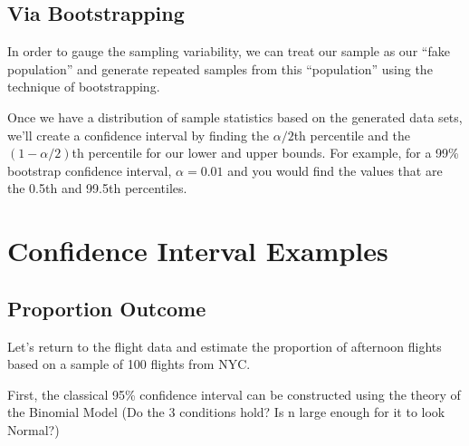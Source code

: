 \documentclass[
]{book}
\newenvironment{Shaded}{\begin{snugshade}}{\end{snugshade}}
\newcommand{\DataTypeTok}[1]{\textcolor[rgb]{0.13,0.29,0.53}{#1}}
\newcommand{\DecValTok}[1]{\textcolor[rgb]{0.00,0.00,0.81}{#1}}
\newcommand{\KeywordTok}[1]{\textcolor[rgb]{0.13,0.29,0.53}{\textbf{#1}}}
\newcommand{\NormalTok}[1]{#1}
\newcommand{\OperatorTok}[1]{\textcolor[rgb]{0.81,0.36,0.00}{\textbf{#1}}}
\newcommand{\StringTok}[1]{\textcolor[rgb]{0.31,0.60,0.02}{#1}}
\begin{document}
\hypertarget{via-bootstrapping}{%
\subsection{Via Bootstrapping}\label{via-bootstrapping}}

In order to gauge the sampling variability, we can treat our sample as our ``fake population'' and generate repeated samples from this ``population'' using the technique of bootstrapping.

Once we have a distribution of sample statistics based on the generated data sets, we'll create a confidence interval by finding the \(\alpha/2\)th percentile and the \((1-\alpha/2)\)th percentile for our lower and upper bounds. For example, for a 99\% bootstrap confidence interval, \(\alpha = 0.01\) and you would find the values that are the 0.5th and 99.5th percentiles.

\hypertarget{confidence-interval-examples}{%
\section{Confidence Interval Examples}\label{confidence-interval-examples}}

\hypertarget{proportion-outcome}{%
\subsection{Proportion Outcome}\label{proportion-outcome}}

Let's return to the flight data and estimate the proportion of afternoon flights based on a sample of 100 flights from NYC.

First, the classical 95\% confidence interval can be constructed using the theory of the Binomial Model (Do the 3 conditions hold? Is n large enough for it to look Normal?)

\begin{Shaded}
\end{Shaded}
\end{document}
